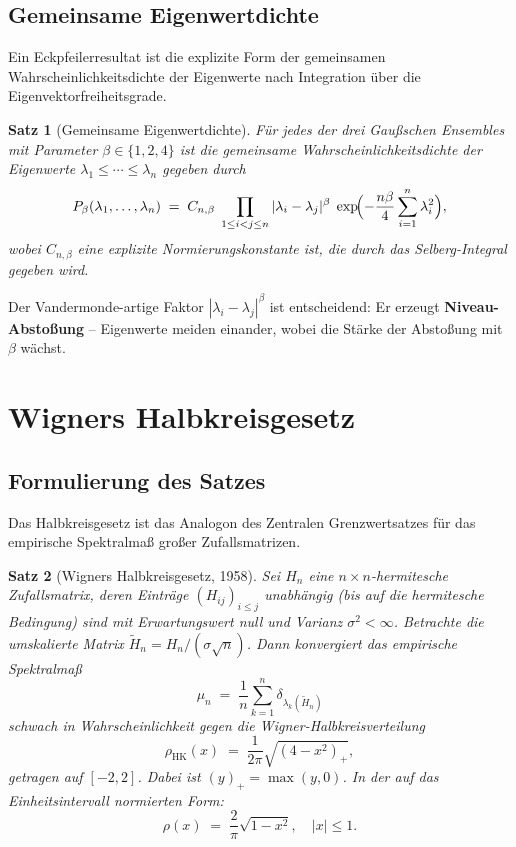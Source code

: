 \documentclass[12pt,a4paper]{amsart}
\newtheorem{theorem}{Satz}[section]
\theoremstyle{definition}
\theoremstyle{remark}
\begin{document}
\subsection{Gemeinsame Eigenwertdichte}

Ein Eckpfeilerresultat ist die explizite Form der gemeinsamen
Wahrscheinlichkeitsdichte der Eigenwerte nach Integration über die
Eigenvektorfreiheitsgrade.

\begin{theorem}[Gemeinsame Eigenwertdichte]
\label{thm:jpdf}
Für jedes der drei Gaußschen Ensembles mit Parameter $\beta \in \{1,2,4\}$
ist die gemeinsame Wahrscheinlichkeitsdichte der Eigenwerte
$\lambda_1 \leq \cdots \leq \lambda_n$ gegeben durch
\[
  P_\beta(\lambda_1,\ldots,\lambda_n)
  \;=\; C_{n,\beta}\;
  \prod_{1 \leq i < j \leq n} |\lambda_i - \lambda_j|^\beta\;
  \exp\!\Bigl(-\frac{n\beta}{4}\sum_{i=1}^n \lambda_i^2\Bigr),
\]
wobei $C_{n,\beta}$ eine explizite Normierungskonstante ist, die durch das
Selberg-Integral gegeben wird.
\end{theorem}

Der Vandermonde-artige Faktor $|\lambda_i - \lambda_j|^\beta$ ist entscheidend:
Er erzeugt \textbf{Niveau-Abstoßung} -- Eigenwerte meiden einander, wobei
die Stärke der Abstoßung mit $\beta$ wächst.

\section{Wigners Halbkreisgesetz}
\label{sec:halbkreis}

\subsection{Formulierung des Satzes}

Das Halbkreisgesetz ist das Analogon des Zentralen Grenzwertsatzes für
das empirische Spektralmaß großer Zufallsmatrizen.

\begin{theorem}[Wigners Halbkreisgesetz, 1958]
\label{thm:halbkreis}
Sei $H_n$ eine $n \times n$-hermitesche Zufallsmatrix, deren Einträge
$(H_{ij})_{i \leq j}$ unabhängig (bis auf die hermitesche Bedingung) sind
mit Erwartungswert null und Varianz $\sigma^2 < \infty$. Betrachte die
umskalierte Matrix $\tilde{H}_n = H_n / (\sigma\sqrt{n})$. Dann konvergiert
das empirische Spektralmaß
\[
  \mu_n \;=\; \frac{1}{n}\sum_{k=1}^n \delta_{\lambda_k(\tilde{H}_n)}
\]
schwach in Wahrscheinlichkeit gegen die Wigner-Halbkreisverteilung
\[
  \rho_{\mathrm{HK}}(x) \;=\; \frac{1}{2\pi}\sqrt{(4-x^2)_+},
\]
getragen auf $[-2,2]$. Dabei ist $(y)_+ = \max(y,0)$.
In der auf das Einheitsintervall normierten Form:
\[
  \rho(x) \;=\; \frac{2}{\pi}\sqrt{1-x^2}, \quad |x| \leq 1.
\]
\end{theorem}
\end{document}
